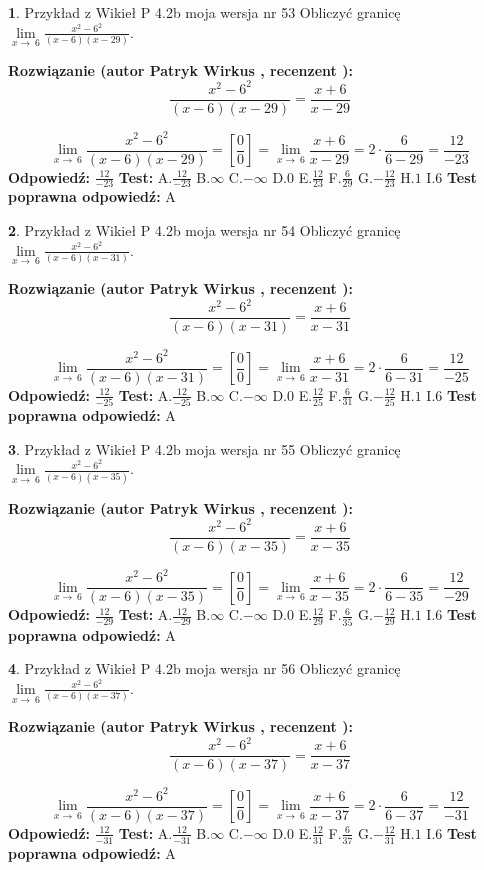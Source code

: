 \documentclass[12pt, a4paper]{article}
\theoremstyle{definition} %
\newtheorem{zad}{}
\newcommand{\zadStart}[1]{\begin{zad}#1\newline}
\newcommand{\zadStop}{\end{zad}}
\newcommand{\rozwStart}[2]{\noindent \textbf{Rozwiązanie (autor #1 , recenzent #2): }\newline}
\newcommand{\rozwStop}{\newline}
\newcommand{\odpStart}{\noindent \textbf{Odpowiedź:}\newline}
\newcommand{\odpStop}{\newline}
\newcommand{\testStart}{\noindent \textbf{Test:}\newline}
\newcommand{\testStop}{\newline}
\newcommand{\kluczStart}{\noindent \textbf{Test poprawna odpowiedź:}\newline}
\newcommand{\kluczStop}{\newline}
\begin{document}
\zadStart{Przykład z Wikieł P 4.2b moja wersja nr 53}
Obliczyć granicę $\lim\limits_{x\to\ 6}\frac{x^{2}-6^{2}}{(x-6)(x-29)}$.
\zadStop
\rozwStart{Patryk Wirkus}{}
$$\frac{x^{2}-6^{2}}{(x-6)(x-29)}=\frac{x+6}{x-29}$$

$$\lim\limits_{x\to\ 6}\frac{x^{2}-6^{2}}{(x-6)(x-29)}=[\frac{0}{0}]=\lim\limits_{x\to\ 6}\frac{x+6}{x-29}=2 \cdot \frac{6}{6-29} = \frac{12}{-23}$$
\rozwStop
\odpStart
$\frac{12}{-23}$
\odpStop
\testStart
A.$\frac{12}{-23}$
B.$\infty$
C.$-\infty$
D.$0$
E.$\frac{12}{23}$
F.$\frac{6}{29}$
G.$-\frac{12}{23}$
H.$1$
I.$6$
\testStop
\kluczStart
A
\kluczStop



\zadStart{Przykład z Wikieł P 4.2b moja wersja nr 54}
Obliczyć granicę $\lim\limits_{x\to\ 6}\frac{x^{2}-6^{2}}{(x-6)(x-31)}$.
\zadStop
\rozwStart{Patryk Wirkus}{}
$$\frac{x^{2}-6^{2}}{(x-6)(x-31)}=\frac{x+6}{x-31}$$

$$\lim\limits_{x\to\ 6}\frac{x^{2}-6^{2}}{(x-6)(x-31)}=[\frac{0}{0}]=\lim\limits_{x\to\ 6}\frac{x+6}{x-31}=2 \cdot \frac{6}{6-31} = \frac{12}{-25}$$
\rozwStop
\odpStart
$\frac{12}{-25}$
\odpStop
\testStart
A.$\frac{12}{-25}$
B.$\infty$
C.$-\infty$
D.$0$
E.$\frac{12}{25}$
F.$\frac{6}{31}$
G.$-\frac{12}{25}$
H.$1$
I.$6$
\testStop
\kluczStart
A
\kluczStop



\zadStart{Przykład z Wikieł P 4.2b moja wersja nr 55}
Obliczyć granicę $\lim\limits_{x\to\ 6}\frac{x^{2}-6^{2}}{(x-6)(x-35)}$.
\zadStop
\rozwStart{Patryk Wirkus}{}
$$\frac{x^{2}-6^{2}}{(x-6)(x-35)}=\frac{x+6}{x-35}$$

$$\lim\limits_{x\to\ 6}\frac{x^{2}-6^{2}}{(x-6)(x-35)}=[\frac{0}{0}]=\lim\limits_{x\to\ 6}\frac{x+6}{x-35}=2 \cdot \frac{6}{6-35} = \frac{12}{-29}$$
\rozwStop
\odpStart
$\frac{12}{-29}$
\odpStop
\testStart
A.$\frac{12}{-29}$
B.$\infty$
C.$-\infty$
D.$0$
E.$\frac{12}{29}$
F.$\frac{6}{35}$
G.$-\frac{12}{29}$
H.$1$
I.$6$
\testStop
\kluczStart
A
\kluczStop



\zadStart{Przykład z Wikieł P 4.2b moja wersja nr 56}
Obliczyć granicę $\lim\limits_{x\to\ 6}\frac{x^{2}-6^{2}}{(x-6)(x-37)}$.
\zadStop
\rozwStart{Patryk Wirkus}{}
$$\frac{x^{2}-6^{2}}{(x-6)(x-37)}=\frac{x+6}{x-37}$$

$$\lim\limits_{x\to\ 6}\frac{x^{2}-6^{2}}{(x-6)(x-37)}=[\frac{0}{0}]=\lim\limits_{x\to\ 6}\frac{x+6}{x-37}=2 \cdot \frac{6}{6-37} = \frac{12}{-31}$$
\rozwStop
\odpStart
$\frac{12}{-31}$
\odpStop
\testStart
A.$\frac{12}{-31}$
B.$\infty$
C.$-\infty$
D.$0$
E.$\frac{12}{31}$
F.$\frac{6}{37}$
G.$-\frac{12}{31}$
H.$1$
I.$6$
\testStop
\kluczStart
A
\kluczStop
\end{document}
